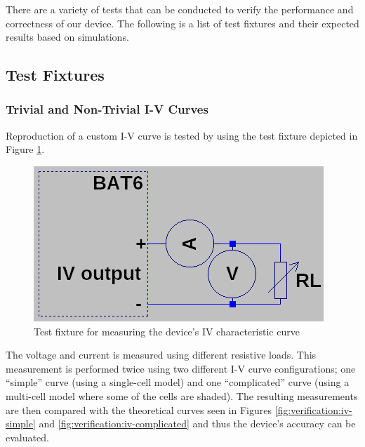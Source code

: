 There are a variety of tests that can be conducted to verify the performance and
correctness of our  device.  The  following is a list of test fixtures and their
expected results based on simulations.

\subsection{Test Fixtures}

\subsubsection{Trivial and Non-Trivial I-V Curves}

Reproduction of a custom I-V  curve is tested by using the test fixture depicted
in Figure \ref{fig:verification:iv-circuit-fix}.

\begin{figure}[th!]
    \centering
    \includegraphics[width=.4\textwidth]{images/sim/iv-curve-circuit.png}
    \caption{Test fixture for measuring the device's IV characteristic curve}
    \label{fig:verification:iv-circuit-fix}
\end{figure}

The  voltage  and  current  is  measured  using  different resistive loads. This
measurement is performed twice using two different I-V curve configurations; one
``simple''  curve (using a single-cell  model)  and  one  ``complicated''  curve
(using a  multi-cell  model  where  some of the cells are shaded). The resulting
measurements are then compared with  the  theoretical  curves  seen  in  Figures
\ref{fig:verification:iv-simple}  and  \ref{fig:verification:iv-complicated} and
thus the device's accuracy can be evaluated.

